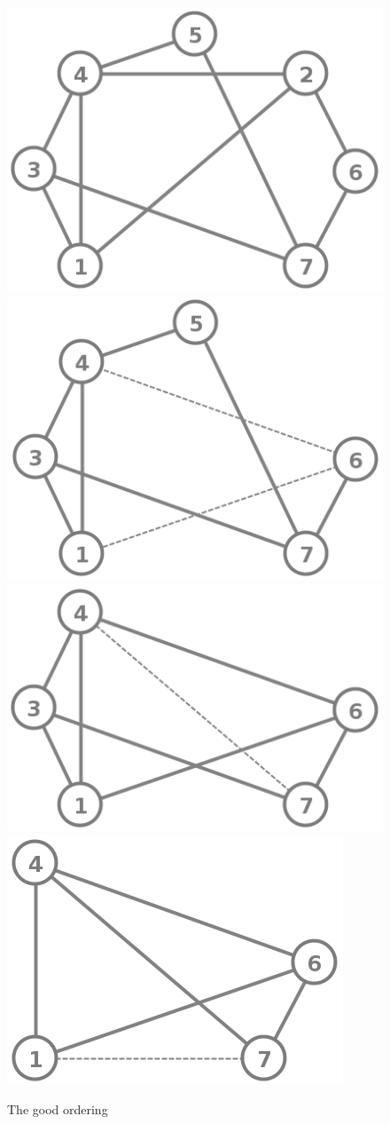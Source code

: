 \documentclass[12pt, oneside]{book}
\begin{document}
\begin{figure}
\centering
   \includegraphics[width=0.4\linewidth]{good_order}
   \hfill
   \includegraphics[width=0.4\linewidth]{good_order_2_removed}
   \includegraphics[width=0.4\linewidth]{good_order_5_2_removed}
   \hfill
   \includegraphics[width=0.25\linewidth]{good_order_3_5_2_removed}
\caption{The good  ordering}
\label{good_order_fillin2}
\end{figure}
\end{document}
